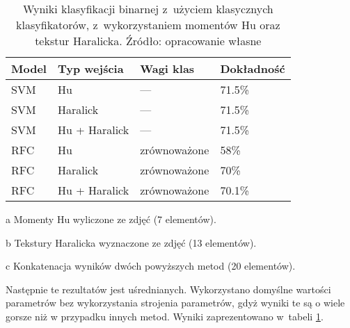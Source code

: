 \begin{table}[!h]
	\centering
	\begin{threeparttable}
		\caption{Wyniki klasyfikacji binarnej z~użyciem klasycznych klasyfikatorów, z~wykorzystaniem momentów Hu oraz tekstur Haralicka. Źródło: opracowanie własne}
		\label{hu_haralick_table}
		\begin{tabularx}{1\textwidth}{ |X|X|X|X| }
		  \hline
		  \textbf{Model} & \textbf{Typ wejścia} & \textbf{Wagi klas} & \textbf{Dokładność}\\

		  \hline
		  SVM & Hu\tnote{a} & — & 71.5\%\\

		  \hline
		  SVM & Haralick\tnote{b} & — & 71.5\%\\

		  \hline
		  SVM & Hu + Haralick\tnote{c} & — & 71.5\%\\

		  \hline
		  RFC & Hu & zrównoważone & 58\%\\

		  \hline
  		  RFC & Haralick & zrównoważone & 70\%\\
  		  
		  \hline
  		  RFC & Hu + Haralick & zrównoważone & 70.1\%\\
  		  
		  \hline
		\end{tabularx}
		\begin{tablenotes}
			\footnotesize
			\item[a] Momenty Hu wyliczone ze zdjęć (7 elementów).
			\item[b] Tekstury Haralicka wyznaczone ze zdjęć (13 elementów).
			\item[c] Konkatenacja wyników dwóch powyższych metod (20 elementów).
		\end{tablenotes}
	\end{threeparttable}
\end{table}
Następnie te  rezultatów jest uśrednianych. Wykorzystano domyślne wartości parametrów bez wykorzystania strojenia parametrów, gdyż wyniki te są o wiele gorsze niż w przypadku innych metod.
Wyniki zaprezentowano w~tabeli \ref{hu_haralick_table}.
